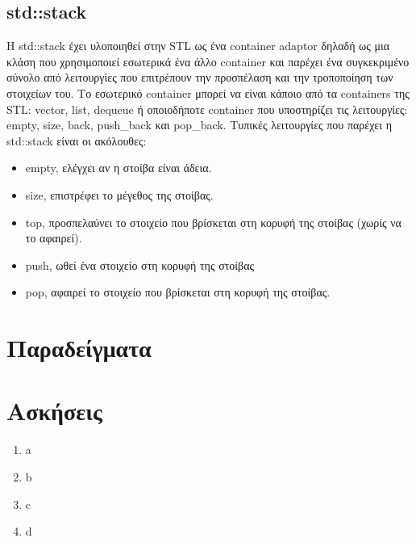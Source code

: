 \subsection{std::stack}
Η std::stack έχει υλοποιηθεί στην STL ως ένα container adaptor δηλαδή ως μια κλάση που χρησιμοποιεί εσωτερικά ένα άλλο container και παρέχει ένα συγκεκριμένο σύνολο από λειτουργίες που επιτρέπουν την προσπέλαση και την τροποποίηση των στοιχείων του. Το εσωτερικό container μπορεί να είναι κάποιο από τα containers της STL: vector, list, dequeue ή οποιοδήποτε container που υποστηρίζει τις λειτουργίες: empty, size, back, push\_back και pop\_back. Τυπικές λειτουργίες που παρέχει η std::stack είναι οι ακόλουθες:
\begin{itemize}
\item empty, ελέγχει αν η στοίβα είναι άδεια.
\item size, επιστρέφει το μέγεθος της στοίβας.
\item top, προσπελαύνει το στοιχείο που βρίσκεται στη κορυφή της στοίβας (χωρίς να το αφαιρεί).
\item push, ωθεί ένα στοιχείο στη κορυφή της στοίβας
\item pop, αφαιρεί το στοιχείο που βρίσκεται στη κορυφή της στοίβας.
\end{itemize}

\section{Παραδείγματα}

\section{Ασκήσεις}
\begin{enumerate}
\item a
\item b
\item c
\item d
\end{enumerate}

\begin{thebibliography}{9}

\end{thebibliography}

